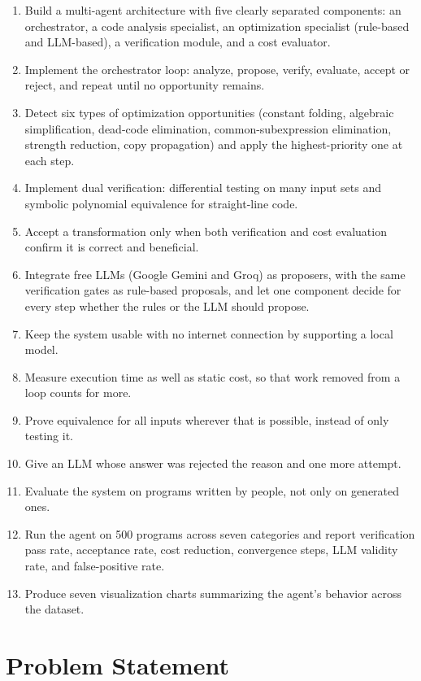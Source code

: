 \documentclass[12pt,a4paper]{report}
\begin{document}
\begin{enumerate}[leftmargin=2cm]
  \item Build a multi-agent architecture with five clearly separated components: an orchestrator, a code analysis specialist, an optimization specialist (rule-based and LLM-based), a verification module, and a cost evaluator.
  \item Implement the orchestrator loop: analyze, propose, verify, evaluate, accept or reject, and repeat until no opportunity remains.
  \item Detect six types of optimization opportunities (constant folding, algebraic simplification, dead-code elimination, common-subexpression elimination, strength reduction, copy propagation) and apply the highest-priority one at each step.
  \item Implement dual verification: differential testing on many input sets and symbolic polynomial equivalence for straight-line code.
  \item Accept a transformation only when both verification and cost evaluation confirm it is correct and beneficial.
  \item Integrate free LLMs (Google Gemini and Groq) as proposers, with the same verification gates as rule-based proposals, and let one component decide for every step whether the rules or the LLM should propose.
  \item Keep the system usable with no internet connection by supporting a local model.
  \item Measure execution time as well as static cost, so that work removed from a loop counts for more.
  \item Prove equivalence for all inputs wherever that is possible, instead of only testing it.
  \item Give an LLM whose answer was rejected the reason and one more attempt.
  \item Evaluate the system on programs written by people, not only on generated ones.
  \item Run the agent on 500 programs across seven categories and report verification pass rate, acceptance rate, cost reduction, convergence steps, LLM validity rate, and false-positive rate.
  \item Produce seven visualization charts summarizing the agent's behavior across the dataset.
\end{enumerate}

\section{Problem Statement}
\end{document}
